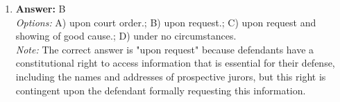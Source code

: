 \documentclass[12pt]{article}
\begin{document}
\begin{enumerate}[label=\arabic*.]
\\ \textit{Note:} The correct answer is based on the principle that a firm offer, while irrevocable, requires a separate signature from the offeree when a form contract is used, ensuring mutual assent and clarity in the contractual agreement under the Uniform Commercial Code.
\item \textbf{Answer:} B
\\ \textit{Options:} A) upon court order.; B) upon request.; C) upon request and showing of good cause.; D) under no circumstances.
\\ \textit{Note:} The correct answer is "upon request" because defendants have a constitutional right to access information that is essential for their defense, including the names and addresses of prospective jurors, but this right is contingent upon the defendant formally requesting this information.
\end{enumerate}
\end{document}
